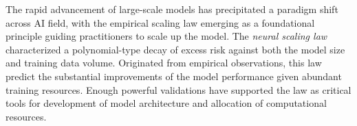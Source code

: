 
The rapid advancement of large-scale models has precipitated a paradigm shift across AI field, with the empirical scaling law emerging as a foundational principle guiding practitioners to scale up the model. The \textit{neural scaling law} \citep{kaplan2020scaling,bahri2024explaining} characterized a polynomial-type decay of excess risk against both the model size and training data volume. Originated from empirical observations, this law predict the substantial improvements of the model performance given abundant training resources. Enough powerful validations have supported the law as critical tools for development of model architecture and allocation of computational resources.




